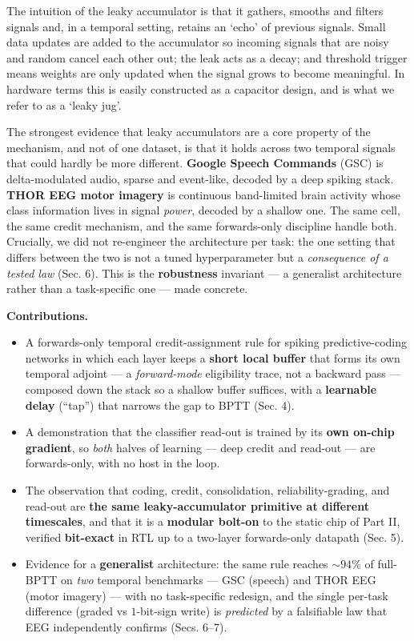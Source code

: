\documentclass[11pt]{article}
\providecommand{\tightlist}{\setlength{\itemsep}{0pt}\setlength{\parskip}{0pt}}
\begin{document}
The intuition of the leaky accumulator is that it gathers, smooths and
filters signals and, in a temporal setting, retains an `echo' of
previous signals. Small data updates are added to the accumulator so
incoming signals that are noisy and random cancel each other out; the
leak acts as a decay; and threshold trigger means weights are only
updated when the signal grows to become meaningful. In hardware terms
this is easily constructed as a capacitor design, and is what we refer
to as a `leaky jug'.

The strongest evidence that leaky accumulators are a core property of
the mechanism, and not of one dataset, is that it holds across two
temporal signals that could hardly be more different. \textbf{Google
Speech Commands} (GSC) is delta-modulated audio, sparse and event-like,
decoded by a deep spiking stack. \textbf{THOR EEG motor imagery} is
continuous band-limited brain activity whose class information lives in
signal \emph{power}, decoded by a shallow one. The same cell, the same
credit mechanism, and the same forwards-only discipline handle both.
Crucially, we did not re-engineer the architecture per task: the one
setting that differs between the two is not a tuned hyperparameter but a
\emph{consequence of a tested law} (Sec. 6). This is the
\textbf{robustness} invariant --- a generalist architecture rather than
a task-specific one --- made concrete.

\textbf{Contributions.}

\begin{itemize}
\tightlist
\item
  A forwards-only temporal credit-assignment rule for spiking
  predictive-coding networks in which each layer keeps a \textbf{short
  local buffer} that forms its own temporal adjoint --- a
  \emph{forward-mode} eligibility trace, not a backward pass ---
  composed down the stack so a shallow buffer suffices, with a
  \textbf{learnable delay} (``tap'') that narrows the gap to BPTT (Sec.
  4).
\item
  A demonstration that the classifier read-out is trained by its
  \textbf{own on-chip gradient}, so \emph{both} halves of learning ---
  deep credit and read-out --- are forwards-only, with no host in the
  loop.
\item
  The observation that coding, credit, consolidation,
  reliability-grading, and read-out are \textbf{the same
  leaky-accumulator primitive at different timescales}, and that it is a
  \textbf{modular bolt-on} to the static chip of Part II, verified
  \textbf{bit-exact} in RTL up to a two-layer forwards-only datapath
  (Sec. 5).
\item
  Evidence for a \textbf{generalist} architecture: the same rule reaches
  \({\sim}94\%\) of full-BPTT on \emph{two} temporal benchmarks --- GSC
  (speech) and THOR EEG (motor imagery) --- with no task-specific
  redesign, and the single per-task difference (graded vs \(1\)-bit-sign
  write) is \emph{predicted} by a falsifiable law that EEG independently
  confirms (Secs. 6--7).
\end{itemize}
\end{document}
